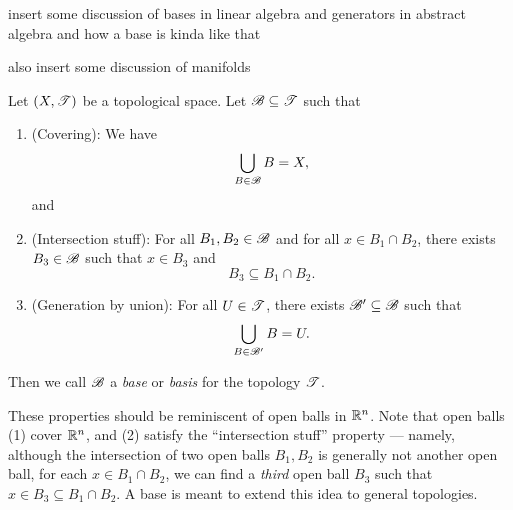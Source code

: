 \documentclass{fkpaper}
\begin{document}
\begin{multicols}{2}
  {\color{blue} insert some discussion of bases in linear algebra and
    generators in abstract algebra and how a base is kinda like that}

  {\color{blue} also insert some discussion of manifolds}


  \begin{definition}[Base]\label{def:base}
    Let $(X, {\mathscr{T}})$ be a topological space. Let ${\mathscr{B}} \subseteq {\mathscr{T}}$ such that
    \begin{enumerate}
      \item (Covering): We have
        \[
        \bigcup_{B \in {\mathscr{B}}} B = X,
        \]
        and
      \item (Intersection stuff): For all $B_1, B_2 \in {\mathscr{B}}$ and
        for all $x \in B_1 \cap B_2$, there exists $B_3 \in {\mathscr{B}}$
        such that $x \in B_3$ and
        \[
        B_3 \subseteq B_1 \cap B_2.
        \]
      \item (Generation by union): For all $U \in {\mathscr{T}}$, there exists
        ${\mathscr{B}}' \subseteq {\mathscr{B}}$ such that
        \[
        \bigcup_{B \in {\mathscr{B}}'} B = U.
        \]
    \end{enumerate}
    Then we call ${\mathscr{B}}$ a \emph{base} or \emph{basis} for the
    topology ${\mathscr{T}}$.
  \end{definition}
  These properties should be reminiscent of open balls in $\mathbb{R}^n$.
  Note that open balls (1) cover $\mathbb{R}^n$, and (2) satisfy the
  ``intersection stuff'' property --- namely, although the
  intersection of two open balls $B_1, B_2$ is generally not another
  open ball, for each $x \in B_1 \cap B_2$, we can find a \emph{third}
  open ball $B_3$ such that $x \in B_3 \subseteq B_1 \cap B_2$. A base
  is meant to extend this idea to general topologies.


\end{multicols}
\end{document}
